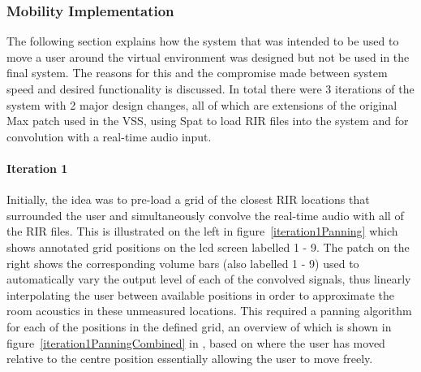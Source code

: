 \documentclass[../../main.tex]{subfiles}
\begin{document}
		\subsubsection{Mobility Implementation}


		The following section explains how the system that was intended to be used to move a user around the virtual environment was designed but not be used in the final system. The reasons for this and the compromise made between system speed and desired functionality is discussed. In total there were 3 iterations of the system with 2 major design changes, all of which are extensions of the original Max patch used in the \ac{VSS}, using Spat to load \ac{RIR} files into the system and for convolution with a real-time audio input.

		 \paragraph{Iteration 1}
		 \label{iteration1}

		 	Initially, the idea was to pre-load a grid of the closest \ac{RIR} locations that surrounded the user and simultaneously convolve the real-time audio with all of the \ac{RIR} files. This is illustrated on the left in figure~\ref{iteration1Panning} which shows annotated grid positions on the lcd screen labelled 1 - 9. The patch on the right shows the corresponding volume bars (also labelled 1 - 9) used to automatically vary the output level of each of the convolved signals, thus linearly interpolating the user between available positions in order to approximate the room acoustics in these unmeasured locations. This required a panning algorithm for each of the positions in the defined grid, an overview of which is shown in figure~\ref{iteration1PanningCombined} in , based on where the user has moved relative to the centre position essentially allowing the user to move freely.
\end{document}
